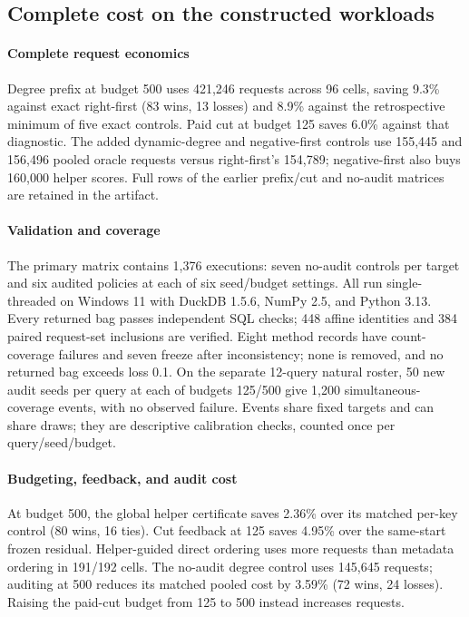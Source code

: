 \subsection{Complete cost on the constructed workloads}
\paragraph*{Complete request economics}
Degree prefix at budget 500 uses 421,246 requests across 96 cells,
saving 9.3\% against exact right-first (83 wins, 13 losses) and 8.9\% against the retrospective minimum
of five exact controls. Paid cut at budget 125 saves 6.0\% against that
diagnostic. The added dynamic-degree and negative-first controls use
155,445 and 156,496 pooled oracle requests versus right-first's 154,789;
negative-first also buys 160,000 helper scores. Full rows of the
earlier prefix/cut and no-audit matrices are retained in the artifact.

\paragraph*{Validation and coverage}
The primary matrix contains 1,376 executions: seven no-audit controls
per target and six audited policies at each of six seed/budget settings.
All run single-threaded on Windows 11 with DuckDB 1.5.6, NumPy 2.5,
and Python 3.13. Every returned bag passes independent SQL checks;
448 affine identities and 384 paired request-set inclusions are verified.
Eight method records have count-coverage failures and seven freeze after
inconsistency; none is removed, and no returned bag exceeds loss 0.1.
On the separate 12-query natural roster, 50 new audit seeds per query
at each of budgets 125/500 give 1,200 simultaneous-coverage events,
with no observed failure. Events share fixed targets and can share draws;
they are descriptive calibration checks, counted once per query/seed/budget.







\paragraph*{Budgeting, feedback, and audit cost}
At budget 500, the global helper certificate saves 2.36\% over its
matched per-key control (80 wins, 16 ties). Cut feedback at 125 saves
4.95\% over the same-start frozen residual. Helper-guided direct
ordering uses more requests than metadata ordering in 191/192 cells.
The no-audit degree control uses 145,645 requests; auditing at 500
reduces its matched pooled cost by 3.59\% (72 wins, 24 losses).
Raising the paid-cut budget from 125 to 500 instead increases requests.

